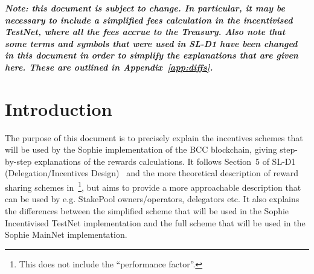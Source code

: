 \documentclass[11pt,a4paper,dvipsnames,twosided,final]{article}
\newcommand{\bcc}{BCC{}}
\newcommand{\bcc}[1]{Bcc}
\begin{document}
\begin{abstract}
  \noindent
  This document provides a high-level overview of the proposed incentives rewards schemes for
  the Sophie Incentivised TestNet and the subsequent MainNet, highlighting key
  differences between the two schemes.  It is intended to act as a
  simple, easy to follow, guide to the operation of each of the incentives schemes that explains each step of the calculation.
  It assumes a basic familiarity with the concepts of a \emph{blockchain} approach.
  The incentives scheme is designed to ensure the correct operation of the Shardagnostic Optimum
  protocol, including maintaining built-in defences against ``Sybil-in-Sybil'' security attacks
  that could lead to corruption of the blockchain.  It builds on sound economic theory.
  A simplified version of the incentives scheme is used for the Incentivised TestNet, using fixed rewards,
  omitting fee calculations, StakePool deposits, the influence of the StakePool owner(s)' pledge on
  the StakePool's desirability, the apparent performance of the StakePool etc. (some of these features may be
  added in later versions of the Incentivised TestNet).
  This document is based on SL-D1 (Delegation/Incentives Design)~\cite{delegation_design} and~\cite{bkks2018} and feeds in to SL-D5
  (Formal Ledger Specification. Version 1)~\cite{sophie_spec} as well as the online rewards calculator and the Sophie Incentivised TestNet and MainNet  implementations and quality assurance programmes.
\end{abstract}

\vspace{3.5in}
\noindent
\textbf{\emph{Note: this document is subject to change.  In particular, it may be necessary to include a simplified fees calculation
    in the incentivised TestNet, where all the fees accrue to the Treasury.
Also note that some terms and symbols that were used in SL-D1 have been changed in this document
in order to simplify the explanations that are given here.  These are outlined in Appendix~\ref{app:diffs}.
}}

\thispagestyle{empty}
\clearpage
\pagestyle{myheadings}
\renewcommand{\thepage}{\arabic{page}}
\setcounter{page}{1}
\section{Introduction}
\label{sec:introduction}

The purpose of this document is to precisely explain the incentives schemes that will be used by the Sophie implementation
of the \bcc{} blockchain, giving step-by-step explanations of the rewards calculations.
It follows Section~5 of SL-D1 (Delegation/Incentives Design)~\cite{delegation_design} and the more theoretical description of reward
sharing schemes in~\cite{bkks2018}\footnote{This does not include the ``performance factor''.}, but aims to provide a more approachable
description that can be used by e.g. StakePool owners/operators, delegators etc.
It also explains the differences between the simplified scheme that will be used in the Sophie Incentivised TestNet implementation and the
full scheme that will be used in the Sophie MainNet implementation.
\end{document}
